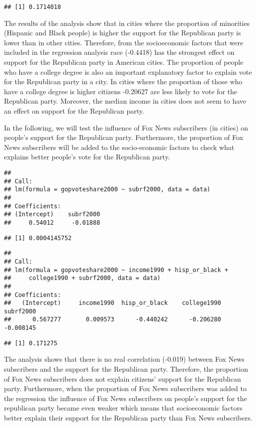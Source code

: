 \documentclass[
]{article}
\begin{document}
\begin{verbatim}
## [1] 0.1714018
\end{verbatim}

The results of the analysis show that in cities where the proportion of minorities (Hispanic and Black people) is higher the support for the Republican party is lower than in other cities. Therefore, from the socioeconomic factors that were included in the regression analysis race (-0.4418) has the strongest effect on support for the Republican party in American cities. The proportion of people who have a college degree is also an important explanatory factor to explain vote for the Republican party in a city. In cities where the proportion of those who have a college degree is higher citizens -0.20627 are less likely to vote for the Republican party. Moreover, the median income in cities does not seem to have an effect on support for the Republican party.

In the following, we will test the influence of Fox News subscribers (in cities) on people's support for the Republican party. Furthermore, the proportion of Fox News subscribers will be added to the socio-economic factors to check what explains better people's vote for the Republican party.

\begin{verbatim}
## 
## Call:
## lm(formula = gopvoteshare2000 ~ subrf2000, data = data)
## 
## Coefficients:
## (Intercept)    subrf2000  
##     0.54012     -0.01888
\end{verbatim}

\begin{verbatim}
## [1] 0.0004145752
\end{verbatim}

\begin{verbatim}
## 
## Call:
## lm(formula = gopvoteshare2000 ~ income1990 + hisp_or_black + 
##     college1990 + subrf2000, data = data)
## 
## Coefficients:
##   (Intercept)     income1990  hisp_or_black    college1990      subrf2000  
##      0.567277       0.009573      -0.440242      -0.206280      -0.008145
\end{verbatim}

\begin{verbatim}
## [1] 0.171275
\end{verbatim}

The analysis shows that there is no real correlation (-0.019) between Fox News subscribers and the support for the Republican party. Therefore, the proportion of Fox News subscribers does not explain citizens' support for the Republican party. Furthermore, when the proportion of Fox News subscribers was added to the regression the influence of Fox News subscribers on people's support for the republican party became even weaker which means that socioeconomic factors better explain their support for the Republican party than Fox News subscribers.
\end{document}
